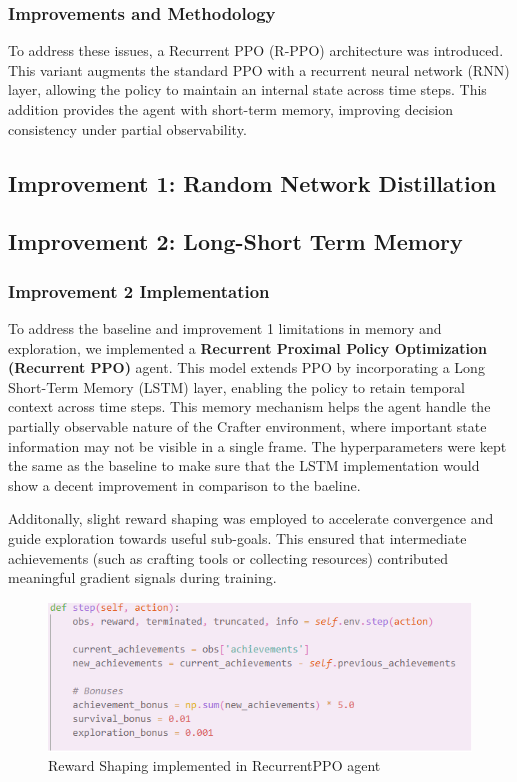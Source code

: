 \documentclass[twocolumn]{article}
\begin{document}
\subsubsection*{Improvements and Methodology}
To address these issues, a Recurrent PPO (R-PPO) architecture was introduced. This variant augments the standard PPO with a recurrent neural network (RNN) layer, allowing the policy to maintain an internal state across time steps. This addition provides the agent with short-term memory, improving decision consistency under partial observability.

\subsection*{Improvement 1: Random Network Distillation}
\subsection*{Improvement 2: Long-Short Term Memory}

\subsubsection*{Improvement 2 Implementation}
To address the baseline and improvement 1 limitations in memory and exploration, we implemented a \textbf{Recurrent Proximal Policy Optimization (Recurrent PPO)} agent. This model extends PPO by incorporating a Long Short-Term Memory (LSTM) layer, enabling the policy to retain temporal context across time steps. This memory mechanism helps the agent handle the partially observable nature of the Crafter environment, where important state information may not be visible in a single frame.
The hyperparameters were kept the same as the baseline to make sure that the LSTM implementation would show a decent improvement in comparison to the baeline.

Additonally, slight reward shaping was employed to accelerate convergence and guide exploration towards useful sub-goals. This ensured that intermediate achievements (such as crafting tools or collecting resources) contributed meaningful gradient signals during training.
\begin{figure}[H]
    \centering
    \includegraphics[width=0.5\linewidth]{images/RewardShaping.png}
    \caption{Reward Shaping implemented in RecurrentPPO agent}
\end{figure}
\end{document}
